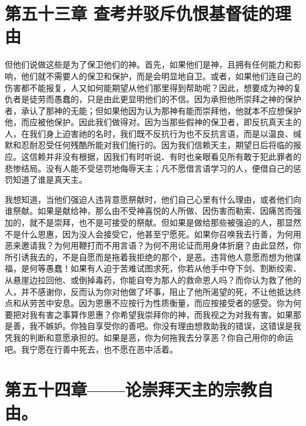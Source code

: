 
\section{第五十三章 查考并驳斥仇恨基督徒的理由}

但他们说做这些是为了保卫他们的神。首先，如果他们是神，且拥有任何能力和影响，他们就不需要人的保卫和保护，而是会明显地自卫。或者，如果他们连自己的伤害都不能报复，人又如何能期望从他们那里得到帮助呢？因此，想要成为神的复仇者是徒劳而愚蠢的，只是由此更显明他们的不信。因为承担他所崇拜之神的保护者，承认了那神的无能；但如果他因为认为那神有能而崇拜他，他就本不应想保护他，而应被他保护。因此我们做得对。因为当那些假神的保卫者，即反抗真天主的人，在我们身上迫害祂的名时，我们既不反抗行为也不反抗言语，而是以温良、缄默和忍耐忍受任何残酷所能对我们施行的。因为我们信赖天主，期望日后将临的报应。这信赖并非没有根据，因我们有时听说、有时也亲眼看见所有敢于犯此罪者的悲惨结局。没有人能不受惩罚地侮辱天主；凡不愿借言语学习的人，便借自己的惩罚知道了谁是真天主。\par

我想知道，当他们强迫人违背意愿祭献时，他们自己心里有什么理由，或者他们向谁祭献。如果是献给神，那么由不受神喜悦的人所做、因伤害而勒索、因痛苦而强加的，就不是崇拜，也不是可接受的祭献。但如果是做给那些被强迫的人，那显然不是什么恩惠，因为没人会接受它，他甚至宁愿死。如果你召唤我去行善，为何用恶来邀请我？为何用鞭打而不用言语？为何不用论证而用身体折磨？由此显然，你所引诱我去的，不是自愿而是拖着我拒绝的那个，是恶。违背他人意愿而想为他谋福，是何等愚蠢！如果有人迫于苦难试图求死，你若从他手中夺下剑、割断绞索、从悬崖边拉回他、或倒掉毒药，你能自夸为那人的救命恩人吗？而你认为救了他的人，并不感谢你，反而认为你对他做了坏事，阻止了他所渴望的死，不让他抵达终点和从劳苦中安息。因为恩惠不应按行为性质衡量，而应按接受者的感受。你为何要把对我有害之事算作恩惠？你希望我崇拜你的神，而我视之为对我有害。如果那是善，我不嫉妒。你独自享受你的善吧。你没有理由想救助我的错误，这错误是我凭我的判断和意愿承担的。如果是恶，你为何拖我去分享恶？你自己用你的命运吧。我宁愿在行善中死去，也不愿在恶中活着。\par


\section{第五十四章——论崇拜天主的宗教自由。}

